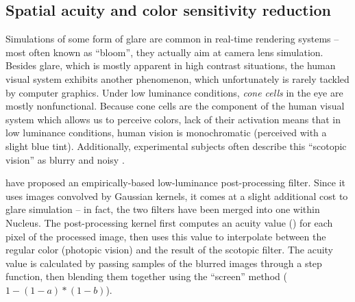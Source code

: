 \subsection{Spatial acuity and color sensitivity reduction}

Simulations of some form of glare are common in real-time rendering systems -- most often known as ``bloom'', they actually aim at camera lens simulation. Besides glare, which is mostly apparent in high contrast situations, the human visual system exhibits another phenomenon, which unfortunately is rarely tackled by computer graphics. Under low luminance conditions, \emph{cone cells} in the eye are mostly nonfunctional. Because cone cells are the component of the human visual system which allows us to perceive colors, lack of their activation means that in low luminance conditions, human vision is monochromatic (perceived with a slight blue tint). Additionally, experimental subjects often describe this ``scotopic vision'' as blurry and noisy \cite{Thompson_aspatial}.

\citet{Thompson_aspatial} have proposed an empirically-based low-luminance post-processing filter. Since it uses images convolved by Gaussian kernels, it comes at a slight additional cost to glare simulation -- in fact, the two filters have been merged into one within Nucleus. The post-processing kernel first computes an acuity value () for each pixel of the processed image, then uses this value to interpolate between the regular color (photopic vision) and the result of the scotopic filter. The acuity value is calculated by passing samples of the blurred images through a step function, then blending them together using the ``screen'' method ($1 - (1-a)*(1-b)$).

